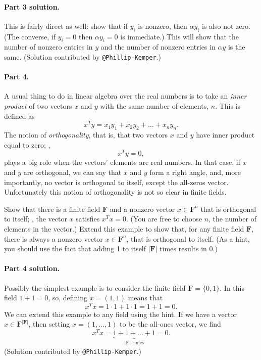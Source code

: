 \documentclass[12pt,hidelinks]{article}
\newcommand{\field}{\mathbf{F}}
\begin{document}
\begin{solution}
\paragraph{Part 3 solution.} This is fairly direct as well: show that if $y_i$
is nonzero, then $\alpha y_i$ is also not zero. (The converse, if $y_i = 0$
then $\alpha y_i = 0$ is immediate.) This will show that the number of nonzero
entries in $y$ and the number of nonzero entries in $\alpha y$ is the same.
(Solution contributed by \verb|@Phillip-Kemper|.)
\end{solution}

\paragraph{Part 4.} A usual thing to do in linear algebra over the real
numbers is to take an \emph{inner product} of two vectors $x$ and $y$ with
the same number of elements, $n$. This is defined as
\[
    x^Ty = x_1y_1 + x_2y_2 + \dots + x_ny_n.
\]
The notion of \emph{orthogonality}, that is, that two vectors $x$ and $y$ have
inner product equal to zero; \ie,
\[
    x^Ty = 0,
\]
plays a big role when the vectors' elements are real numbers. In that case, if
$x$ and $y$ are orthogonal, we can say that $x$ and $y$ form a right angle,
and, more importantly, no vector is orthogonal to itself, except the all-zeros
vector. Unfortunately this notion of orthogonality is not so clear in finite
fields.

Show that there is a finite field $\field$ and a nonzero vector $x \in
\field^n$ that is orthogonal to itself; \ie, the vector $x$ satisfies $x^Tx =
0$. (You are free to choose $n$, the number of elements in the vector.) Extend
this example to show that, for any finite field $\field$, there is always a
nonzero vector $x \in \field^n$, that is orthogonal to itself. (As a hint, you
should use the fact that adding 1 to itself $|\field|$ times results in 0.)

\begin{solution}
\paragraph{Part 4 solution.} Possibly the simplest example is to consider
the finite field $\field = \{0, 1\}$. In this field $1 + 1 = 0$, so, defining
$x = (1,1)$ means that
\[
    x^Tx = 1\cdot 1 + 1\cdot1 = 1+1 = 0.
\]
We can extend this example to any field using the hint. If we have a vector
$x \in \field^{|\field|}$, then setting $x = (1, \dots, 1)$ to be the all-ones
vector, we find
\[
    x^Tx = \underbrace{1 + 1 + \dots + 1}_\text{$|\field|$ times} = 0.
\]
(Solution contributed by \verb|@Phillip-Kemper|.)
\end{solution}
\end{document}
